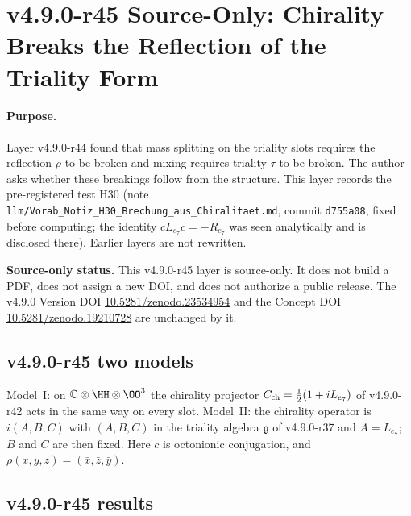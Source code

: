 \clearpage
\section*{v4.9.0-r45 Source-Only: Chirality Breaks the Reflection of the Triality Form}
\label{sec:v490-r45-chirality-breaks-reflection}

\paragraph{Purpose.}
Layer v4.9.0-r44 found that mass splitting on the triality slots requires the reflection \(\rho\) to be broken and mixing requires triality
\(\tau\) to be broken.  The author asks whether these breakings follow from the structure.  This layer records the pre-registered test H30
(note \texttt{llm/Vorab\_Notiz\_H30\_Brechung\_aus\_Chiralitaet.md}, commit \texttt{d755a08}, fixed before computing; the identity
\(cL_{e_7}c=-R_{e_7}\) was seen analytically and is disclosed there).  Earlier layers are not rewritten.

\noindent\textbf{Source-only status.}
This v4.9.0-r45 layer is source-only.  It does not build a PDF, does not assign a new DOI,
and does not authorize a public release.  The v4.9.0 Version DOI
\href{https://doi.org/10.5281/zenodo.23534954}{10.5281/zenodo.23534954} and the Concept DOI
\href{https://doi.org/10.5281/zenodo.19210728}{10.5281/zenodo.19210728} are unchanged by it.

\subsection*{v4.9.0-r45 two models}
\label{subsec:v490-r45-models}

Model~I: on \(\mathbb C\otimes\HH\otimes\OO^3\) the chirality projector \(C_{\rm ch}=\tfrac12(1+iL_{e_7})\) of v4.9.0-r42 acts in the same way on
every slot.  Model~II: the chirality operator is \(i(A,B,C)\) with \((A,B,C)\) in the triality algebra \(\mathfrak g\) of v4.9.0-r37 and
\(A=L_{e_7}\); \(B\) and \(C\) are then fixed.  Here \(c\) is octonionic conjugation, and \(\rho(x,y,z)=(\bar x,\bar z,\bar y)\).

\subsection*{v4.9.0-r45 results}
\label{subsec:v490-r45-results}

